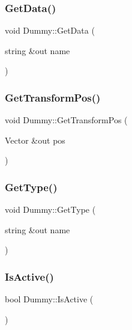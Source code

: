\hypertarget{class_dummy_a5f6a8f72a647cecddafa92517a3e5891}{}\label{class_dummy_a5f6a8f72a647cecddafa92517a3e5891} 
\subsubsection{\texorpdfstring{Get\+Data()}{GetData()}}
{\footnotesize\ttfamily void Dummy\+::\+Get\+Data (\begin{DoxyParamCaption}\item[{string \&out}]{name }\end{DoxyParamCaption})}

\hypertarget{class_dummy_abad9d9d1ad1b457149f727f629a9d770}{}\label{class_dummy_abad9d9d1ad1b457149f727f629a9d770} 
\subsubsection{\texorpdfstring{Get\+Transform\+Pos()}{GetTransformPos()}}
{\footnotesize\ttfamily void Dummy\+::\+Get\+Transform\+Pos (\begin{DoxyParamCaption}\item[{Vector \&out}]{pos }\end{DoxyParamCaption})}

\hypertarget{class_dummy_a6395fd33323a1a1517228b992a01d922}{}\label{class_dummy_a6395fd33323a1a1517228b992a01d922} 
\subsubsection{\texorpdfstring{Get\+Type()}{GetType()}}
{\footnotesize\ttfamily void Dummy\+::\+Get\+Type (\begin{DoxyParamCaption}\item[{string \&out}]{name }\end{DoxyParamCaption})}

\hypertarget{class_dummy_ad4f2cb10515621b0ca1e8e834519f77c}{}\label{class_dummy_ad4f2cb10515621b0ca1e8e834519f77c} 
\subsubsection{\texorpdfstring{Is\+Active()}{IsActive()}}
{\footnotesize\ttfamily bool Dummy\+::\+Is\+Active (\begin{DoxyParamCaption}{ }\end{DoxyParamCaption})}

